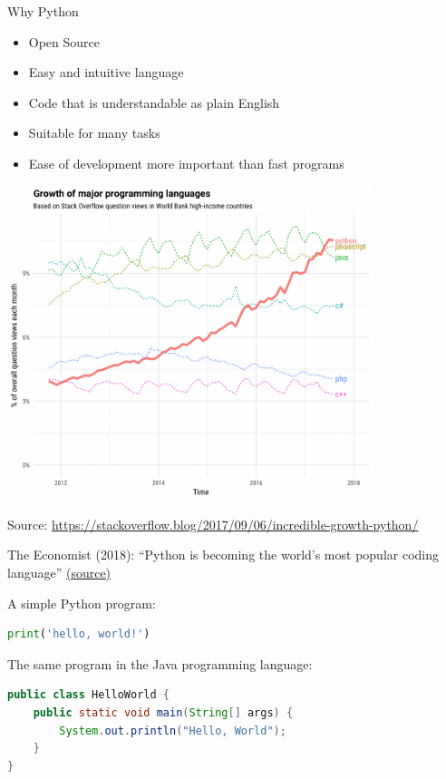 \documentclass{beamer}
\begin{document}
\begin{frame}{Why Python}
	\begin{itemize}
		\item Open Source
		\item Easy and intuitive language
		\item Code that is understandable as plain English
		\item Suitable for many tasks
		\item Ease of development more important than fast programs
	\end{itemize}
\end{frame}

\begin{frame}
    \centering
    \includegraphics[width=0.8\textwidth]{fig/pythongrowth.png}

    Source: \url{https://stackoverflow.blog/2017/09/06/incredible-growth-python/}

    The Economist (2018): ``Python is becoming the world’s most popular coding language''
    \href{https://www.economist.com/graphic-detail/2018/07/26/python-is-becoming-the-worlds-most-popular-coding-language}{(source)}

\end{frame}

\begin{frame}[fragile]
A simple Python program:
\begin{lstlisting}[language=python]
print('hello, world!')
\end{lstlisting}
\pause

\vspace{1em}
The same program in the Java programming language:
\begin{lstlisting}[language=java]
public class HelloWorld {
    public static void main(String[] args) {
        System.out.println("Hello, World");
    }
}
\end{lstlisting}
\end{frame}
\end{document}
